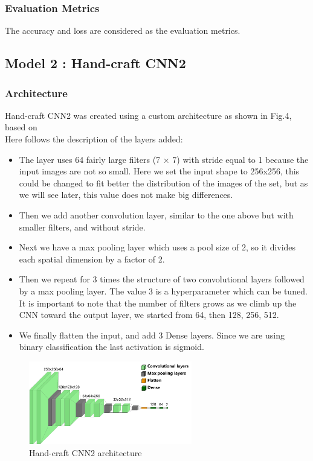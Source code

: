 \documentclass[conference]{IEEEtran}
\begin{document}
\subsubsection{Evaluation Metrics}
The accuracy and loss are considered as the evaluation metrics.


\subsection{Model 2 : Hand-craft CNN2}
\subsubsection{Architecture}
Hand-craft CNN2 was created using a custom architecture as shown in Fig.4, based on \cite{hands-on}\\
Here follows the description of the layers added:
\begin{itemize}
    \item The layer uses 64 fairly large filters (7 × 7) with stride equal to 1 because  the input images are not so small. Here we set the input shape to 256x256, this could be changed to fit better the distribution of the images of the set, but as we will see later, this value does not make big differences.
    \item Then we add another convolution layer, similar to the one above but with smaller filters, and without stride.
    \item Next we have a max pooling layer which uses a pool size of 2, so it divides each spatial dimension by a factor of 2.
    \item Then we repeat for 3 times the structure of two convolutional layers followed by a max pooling layer. The value 3 is a hyperparameter which can be tuned. It is important to note that the number of filters grows as we climb up the CNN toward the output layer, we started from 64, then 128, 256, 512. 
    \item We finally flatten the input, and add 3 Dense layers. Since we are using binary classification the last activation is sigmoid.
    
\end{itemize}

\begin{figure}[ht!] %
\centering
\includegraphics[width=2.8in]{CNN2.pdf}
\caption{ Hand-craft CNN2 architecture}
\label{bench}
\end{figure}
\end{document}
